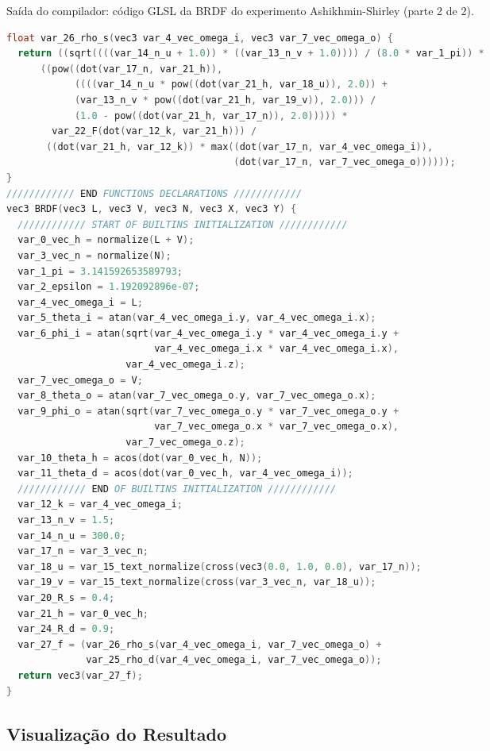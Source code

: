 \begin{codigo}[H]
    \caption{\small Saída do compilador: código GLSL da BRDF do experimento Ashikhmin-Shirley (parte 2 de 2).}
    \label{cod-ashikhmin-shirley-close-to-original-glsl-pt-2}
\begin{lstlisting}[language=C, inputencoding=utf8]
float var_26_rho_s(vec3 var_4_vec_omega_i, vec3 var_7_vec_omega_o) {
  return ((sqrt((((var_14_n_u + 1.0)) * ((var_13_n_v + 1.0)))) / (8.0 * var_1_pi)) *
      ((pow((dot(var_17_n, var_21_h)),
            ((((var_14_n_u * pow((dot(var_21_h, var_18_u)), 2.0)) +
            (var_13_n_v * pow((dot(var_21_h, var_19_v)), 2.0))) /
            (1.0 - pow((dot(var_21_h, var_17_n)), 2.0))))) *
        var_22_F(dot(var_12_k, var_21_h))) /
       ((dot(var_21_h, var_12_k)) * max((dot(var_17_n, var_4_vec_omega_i)),
                                        (dot(var_17_n, var_7_vec_omega_o))))));
}
//////////// END FUNCTIONS DECLARATIONS ////////////
vec3 BRDF(vec3 L, vec3 V, vec3 N, vec3 X, vec3 Y) {
  //////////// START OF BUILTINS INITIALIZATION ////////////
  var_0_vec_h = normalize(L + V);
  var_3_vec_n = normalize(N);
  var_1_pi = 3.141592653589793;
  var_2_epsilon = 1.192092896e-07;
  var_4_vec_omega_i = L;
  var_5_theta_i = atan(var_4_vec_omega_i.y, var_4_vec_omega_i.x);
  var_6_phi_i = atan(sqrt(var_4_vec_omega_i.y * var_4_vec_omega_i.y +
                          var_4_vec_omega_i.x * var_4_vec_omega_i.x),
                     var_4_vec_omega_i.z);
  var_7_vec_omega_o = V;
  var_8_theta_o = atan(var_7_vec_omega_o.y, var_7_vec_omega_o.x);
  var_9_phi_o = atan(sqrt(var_7_vec_omega_o.y * var_7_vec_omega_o.y +
                          var_7_vec_omega_o.x * var_7_vec_omega_o.x),
                     var_7_vec_omega_o.z);
  var_10_theta_h = acos(dot(var_0_vec_h, N));
  var_11_theta_d = acos(dot(var_0_vec_h, var_4_vec_omega_i));
  //////////// END OF BUILTINS INITIALIZATION ////////////
  var_12_k = var_4_vec_omega_i;
  var_13_n_v = 1.5;
  var_14_n_u = 300.0;
  var_17_n = var_3_vec_n;
  var_18_u = var_15_text_normalize(cross(vec3(0.0, 1.0, 0.0), var_17_n));
  var_19_v = var_15_text_normalize(cross(var_3_vec_n, var_18_u));
  var_20_R_s = 0.4;
  var_21_h = var_0_vec_h;
  var_24_R_d = 0.9;
  var_27_f = (var_26_rho_s(var_4_vec_omega_i, var_7_vec_omega_o) +
              var_25_rho_d(var_4_vec_omega_i, var_7_vec_omega_o));
  return vec3(var_27_f);
}
\end{lstlisting}
\end{codigo}

\subsection{Visualização do Resultado}

